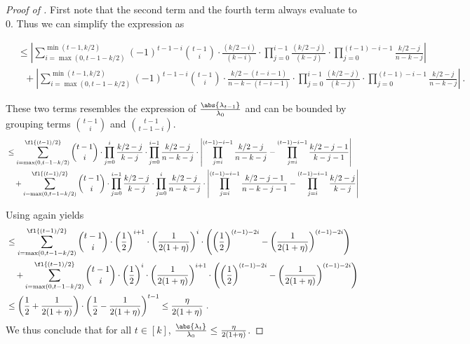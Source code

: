 \begin{proof}[Proof of ]
    First note that the second term and the fourth term always evaluate to $0$. Thus we can simplify the expression as 

    \begin{align*}
        &\le\left|\sum_{i=\max(0,t-1-k/2) }^{ \min(t-1,k/2)} (-1)^{t-1-i}\binom{t-1}{i}\cdot \frac{ (k/2-i)}{(k-i)} \cdot  \prod_{j=0}^{i-1} \frac{ (k/2-j)}{(k-j)} \cdot \prod_{j=0}^{(t-1)-i-1} \frac{  k/2-j}{ n-k-j} \right| \\
        &~~~+\left|\sum_{i=\max(0,t-1-k/2) }^{ \min(t-1,k/2)} (-1)^{t-1-i} \binom{t-1}{i} \cdot \frac{  k/2-(t-i-1)}{ n-k-(t-i-1)}\cdot \prod_{j=0}^{i-1} \frac{ (k/2-j)}{(k-j)} \cdot \prod_{j=0}^{(t-1)-i-1} \frac{  k/2-j}{ n-k-j} \right|~.
    \end{align*}

    These two terms resembles the expression of $\frac{\abs{\lambda_{t-1}}}{\lambda_0}$ and can be bounded by grouping terms $\binom{t-1}{i}$ and $\binom{t-1}{t-1-i}$.
    \begin{align*}
        &\le \sum_{i=\max(0,t-1-k/2)}^{\fl{(t-1)/2}} \binom{t-1}{i}  \cdot    \prod_{j=0}^{i}\frac{ k/2-j}{k-j} \cdot \prod_{j=0}^{i-1} \frac{ k/2-j}{n-k-j}  \cdot \left|\prod_{j=i}^{(t-1)-i-1}\frac{k/2-j}{ n-k-j} - \prod_{j=i}^{(t-1)-i-1} \frac{k/2-j-1}{k-j-1} \right| \\
        &~~~+\sum_{i=\max(0,t-1-k/2)}^{\fl{(t-1)/2}} \binom{t-1}{i}  \cdot    \prod_{j=0}^{i-1}\frac{ k/2-j}{k-j} \cdot \prod_{j=0}^{i} \frac{ k/2-j}{n-k-j}  \cdot \left|\prod_{j=i}^{(t-1)-i-1}\frac{k/2-j-1}{ n-k-j-1} - \prod_{j=i}^{(t-1)-i-1} \frac{k/2-j}{k-j} \right|
    \end{align*}

    Using  again yields 
    \begin{align*}
        &\le \sum_{i=\max(0,t-1-k/2)}^{\fl{(t-1)/2}} \binom{t-1}{i}  \cdot  \left(\frac{1}{2}\right)^{i+1}\cdot \left(\frac{1}{2(1+\eta)}\right)^{i} \cdot \left(\left(\frac{1}{2}\right)^{(t-1)-2i}  - \left(\frac{1}{2(1+\eta)}\right)^{(t-1)-2i} \right) \\
        &~~~+\sum_{i=\max(0,t-1-k/2)}^{\fl{(t-1)/2}} \binom{t-1}{i}  \cdot  \left(\frac{1}{2}\right)^{i}\cdot \left(\frac{1}{2(1+\eta)}\right)^{i+1} \cdot \left(\left(\frac{1}{2}\right)^{(t-1)-2i}  - \left(\frac{1}{2(1+\eta)}\right)^{(t-1)-2i} \right)\\
        &\le \left(\frac{1}{2}+\frac{1}{2(1+\eta)}\right)\cdot \left(\frac{1}{2} - \frac{1}{2(1+\eta)} \right)^{t-1} \le\frac{\eta}{2(1+\eta)}~.
    \end{align*}
    We thus conclude that for all $t\in[k]$, $\frac{\abs{\lambda_t}}{\lambda_0}\le \frac{\eta}{2(1+\eta)}$.
\end{proof}  
